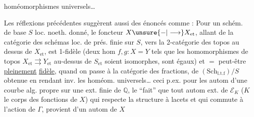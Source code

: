 homéomorphismes universels\ldots

Les réflexions précédentes suggèrent aussi des énoncés comme   : Pour un schém. de base $S$ loc. noeth. donné,
le foncteur $X\unsure{-|\longrightarrow}X_{\mathrm{et}}$, allant de la catégorie des schémas loc. de prés. finie  sur $S$, vers la 2-catégorie des topos au dessus de $X_{\mathrm{et}}$, est  1-fidèle (deux hom $f,g:X=Y$ tels que les homomorphismes de topos  $X_{\mathrm{et}}\rightrightarrows Y_{\mathrm{et}}$ au-dessus de $S_{\mathrm{et}}$ soient  isomorphes, sont égaux) et $=$ peut-être \uline{pleinement} \uline{fidèle}, quand on passe à la catégorie des fractions, de $(\mathrm{Sch}_{\mathrm{l.t.f}})/S$ obtenue en rendant inv. les homéom. universels\ldots {}  ceci p.ex. pour les autom d'une courbe alg. propre sur une ext. finie de $\mathbb{Q}$,   le ``fait'' que tout autom ext. de $\mathcal E_K$ ($K$ le corps des fonctions de $X$) qui respecte la structure à lacets et qui commute à l'action de $\Gamma$, provient d'un autom de $X$
